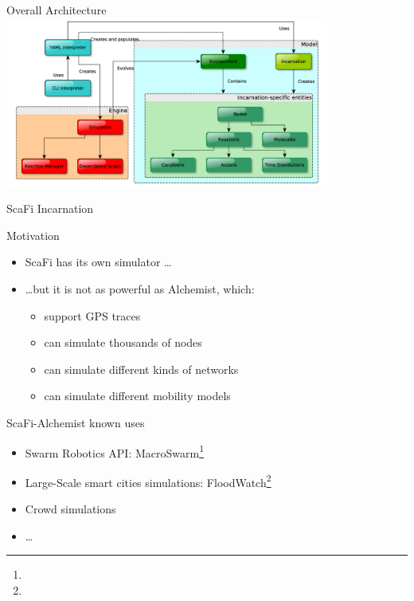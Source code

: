 \documentclass[presentation, 8pt]{beamer}\mode<presentation>{\usetheme{AMSBolognaFC}}
\begin{document}
\begin{frame}{Overall Architecture}
\centering
\includegraphics[width=0.8\textwidth]{img/alchemist-architecture.png}
\end{frame}
\begin{frame}{ScaFi Incarnation}
\begin{block}{Motivation}
	\begin{itemize}
		\item ScaFi has its own simulator \dots
		\item \dots but it is not as powerful as Alchemist, which:
		\begin{itemize}
			\item support GPS traces
			\item can simulate thousands of nodes
			\item can simulate different kinds of networks
			\item can simulate different mobility models
		\end{itemize}
	\end{itemize}
\end{block}
\begin{exampleblock}{ScaFi-Alchemist known uses}
	\begin{itemize}
		\item Swarm Robotics API: MacroSwarm\footnote[frame]{}
		\item Large-Scale smart cities simulations: FloodWatch\footnote[frame]{}
		\item Crowd simulations
		\item \dots
	\end{itemize}
\end{exampleblock}
\end{frame}
\end{document}
